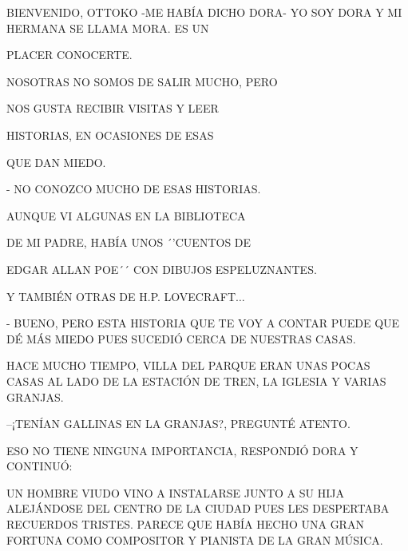 \newpage
{}

BIENVENIDO, OTTOKO -ME HABÍA DICHO DORA- YO SOY  DORA Y MI HERMANA SE LLAMA MORA.  ES UN

PLACER CONOCERTE. 

NOSOTRAS NO SOMOS DE SALIR MUCHO, PERO 

NOS GUSTA RECIBIR VISITAS Y LEER 

HISTORIAS, EN OCASIONES DE ESAS 

QUE DAN MIEDO.

- NO CONOZCO MUCHO DE ESAS HISTORIAS.

AUNQUE VI ALGUNAS EN LA BIBLIOTECA 

DE MI PADRE, HABÍA UNOS ´'CUENTOS DE 

EDGAR ALLAN POE´´ CON DIBUJOS ESPELUZNANTES.

Y TAMBIÉN OTRAS DE H.P. LOVECRAFT$\ldots$ 


\newpage
{}
- BUENO, PERO ESTA HISTORIA QUE TE VOY A CONTAR PUEDE QUE DÉ MÁS MIEDO PUES SUCEDIÓ CERCA DE NUESTRAS CASAS.

HACE MUCHO TIEMPO, VILLA DEL PARQUE ERAN UNAS POCAS CASAS AL LADO DE LA ESTACIÓN DE TREN, LA IGLESIA Y VARIAS GRANJAS. 

--¡TENÍAN GALLINAS EN LA GRANJAS?, PREGUNTÉ ATENTO.

ESO NO TIENE NINGUNA IMPORTANCIA, RESPONDIÓ DORA Y CONTINUÓ:

UN HOMBRE VIUDO VINO A INSTALARSE JUNTO A SU HIJA ALEJÁNDOSE DEL CENTRO DE LA CIUDAD PUES LES DESPERTABA RECUERDOS TRISTES. PARECE QUE HABÍA HECHO UNA GRAN FORTUNA COMO  COMPOSITOR Y PIANISTA DE LA GRAN MÚSICA.

